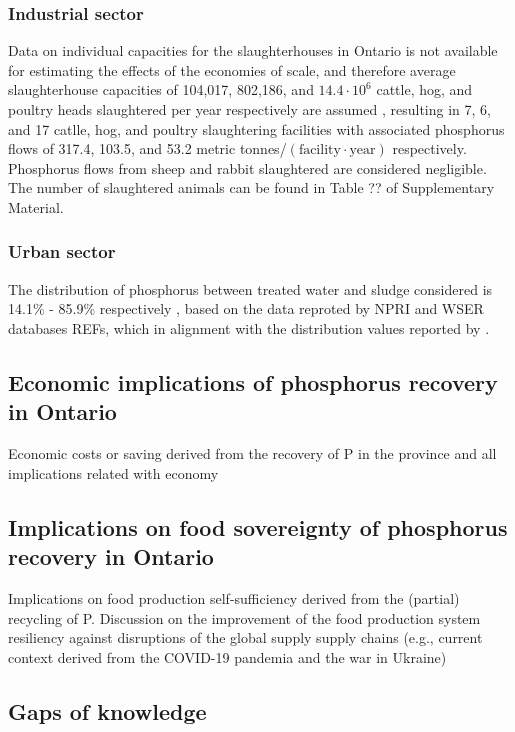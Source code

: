 \documentclass[authoryear]{elsarticle}
\begin{document}
\subsubsection{Industrial sector}
Data on individual capacities for the slaughterhouses in Ontario is not available for estimating the effects of the economies of scale, and therefore average slaughterhouse capacities of 104,017, 802,186, and $14.4 \cdot 10^6$ cattle, hog, and poultry heads slaughtered per year respectively are assumed \citep{SlaughterhouseDistribution, SlaughterhousePoultryAverageSize}, resulting in 7, 6, and 17 catlle, hog, and poultry slaughtering facilities with associated phosphorus flows of 317.4, 103.5, and 53.2 metric tonnes/$\left(\text{facility} \cdot \text{year}\right) $ respectively. Phosphorus flows from sheep and rabbit slaughtered are considered negligible. The number of slaughtered animals can be found in Table ?? of Supplementary Material.

\subsubsection{Urban sector}
The distribution of phosphorus between treated water and sludge considered is 14.1\% - 85.9\% respectively \citep{PFlows_Ontario}, based on the data reproted by NPRI and WSER databases REFs, which in alignment with the distribution values reported by \citep{egle_phosphorus_2016}.

\subsection{Economic implications of phosphorus recovery in Ontario}
Economic costs or saving derived from the recovery of P in the province and all implications related with economy

\subsection{Implications on food sovereignty of phosphorus recovery in Ontario}
Implications on food production self-sufficiency derived from the (partial) recycling of P. Discussion on the improvement of the food production system resiliency against disruptions of the global supply supply chains  (e.g., current context derived from the COVID-19 pandemia and the war in Ukraine)

\subsection{Gaps of knowledge}
\end{document}
